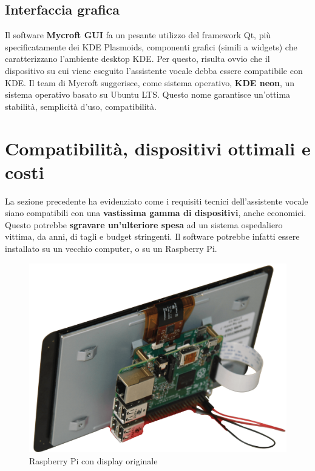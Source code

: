 \subsection{Interfaccia grafica}
Il software \textbf{Mycroft GUI} fa un pesante utilizzo del framework Qt, più specificatamente dei KDE Plasmoids, componenti grafici (simili a widgets) che caratterizzano l'ambiente desktop KDE. Per questo, risulta ovvio che il dispositivo su cui viene eseguito l'assistente vocale debba essere compatibile con KDE. Il team di Mycroft suggerisce, come sistema operativo, \textbf{KDE neon}, un sistema operativo basato su Ubuntu LTS. Questo nome garantisce un'ottima stabilità, semplicità d'uso, compatibilità.
\section{Compatibilità, dispositivi ottimali e costi}
La sezione precedente ha evidenziato come i requisiti tecnici dell'assistente vocale siano compatibili con una \textbf{vastissima gamma di dispositivi}, anche economici. Questo potrebbe \textbf{sgravare un'ulteriore spesa} ad un sistema ospedaliero vittima, da anni, di tagli e budget stringenti. Il software potrebbe infatti essere installato su un vecchio computer, o su un Raspberry Pi.
\begin{figure}[H]
    \begin{center}
        \includegraphics[width=0.8\columnwidth]{images/applicabilita/RPiwithDisplay.png}
    \end{center}
    \caption{Raspberry Pi con display originale}
    \label{fig:raspi-with-display}
\end{figure}
